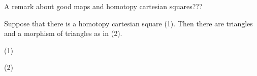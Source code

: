     \begin{remark}
        A remark about good maps and homotopy cartesian squares???
    \end{remark}

    \begin{lemma}
        Suppose that there is a homotopy cartesian square (1). Then there are triangles and a morphism of triangles as in (2).
        \begin{center}
            (1)
            (2)
        \end{center}
    \end{lemma}

